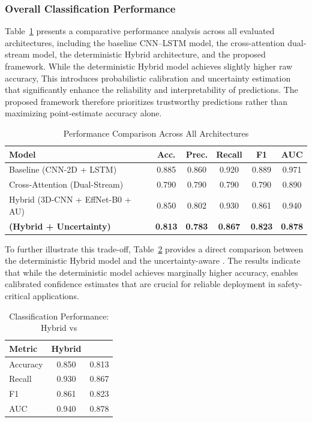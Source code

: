 \documentclass[conference]{IEEEtran}
\begin{document}
\subsubsection{Overall Classification Performance}

Table~\ref{tab:all_arch_comparison} presents a comparative performance analysis across all evaluated architectures, including the baseline CNN–LSTM model, the cross-attention dual-stream model, the deterministic Hybrid architecture, and the proposed framework.
While the deterministic Hybrid model achieves slightly higher raw accuracy, This introduces probabilistic calibration and uncertainty estimation that significantly enhance the reliability and interpretability of predictions. The proposed framework therefore prioritizes trustworthy predictions rather than maximizing point-estimate accuracy alone.

\begin{table}[H]
\centering
\caption{Performance Comparison Across All Architectures}
\label{tab:all_arch_comparison}
\footnotesize
\setlength{\tabcolsep}{2pt}
\renewcommand{\arraystretch}{1.0}
\begin{tabular}{lccccc}
\hline
\textbf{Model} & \textbf{Acc.} & \textbf{Prec.} & \textbf{Recall} & \textbf{F1} & \textbf{AUC} \\
\hline
Baseline (CNN-2D + LSTM) & 0.885 & 0.860 & 0.920 & 0.889 & 0.971 \\
Cross-Attention (Dual-Stream) & 0.790 & 0.790 & 0.790 & 0.790 & 0.890 \\
Hybrid (3D-CNN + EffNet-B0 + AU) & 0.850 & 0.802 & 0.930 & 0.861 & 0.940 \\
\textbf{ (Hybrid + Uncertainty)} & \textbf{0.813} & \textbf{0.783} & \textbf{0.867} & \textbf{0.823} & \textbf{0.878} \\
\hline
\end{tabular}
\end{table}

To further illustrate this trade-off, Table~\ref{tab:hybrid_vs_pipelineD} provides a direct comparison between the deterministic Hybrid model and the uncertainty-aware . The results indicate that while the deterministic model achieves marginally higher accuracy,  enables calibrated confidence estimates that are crucial for reliable deployment in safety-critical applications.

\begin{table}[H]
\centering
\caption{Classification Performance: Hybrid vs }
\label{tab:hybrid_vs_pipelineD}
\footnotesize
\setlength{\tabcolsep}{4pt}
\renewcommand{\arraystretch}{1.0}
\begin{tabular}{lcc}
\hline
\textbf{Metric} & \textbf{Hybrid} & \textbf{} \\
\hline
Accuracy & 0.850 & 0.813 \\
Recall  & 0.930 & 0.867 \\
F1      & 0.861 & 0.823 \\
AUC     & 0.940 & 0.878 \\
\hline
\end{tabular}
\end{table}
\end{document}
